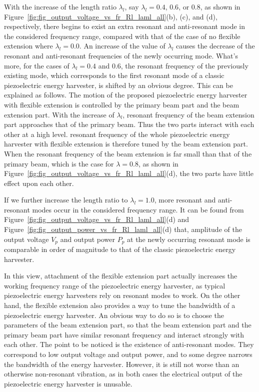 \documentclass{elsarticle}
\begin{document}
With the increase of the length ratio $\lambda_l$, say $\lambda_l = 0.4$, $0.6$, or $0.8$, as shown in Figure~\ref{fig:fig_output_voltage_vs_fr_Rl_laml_all}(b), (c), and (d), respectively, there begins to exist an extra resonant and anti-resonant mode in the considered frequency range, compared with that of the case of no flexible extension where $\lambda_l = 0.0$. An increase of the value of $\lambda_l$ causes the decrease of the resonant and anti-resonant frequencies of the newly occurring mode. What's more, for the cases of $\lambda_l = 0.4$ and $0.6$, the resonant frequency of the previously existing mode, which corresponds to the first resonant mode of a classic piezoelectric energy harvester, is shifted by an obvious degree. This can be explained as follows. The motion of the proposed piezoelectric energy harvester with flexible extension is controlled by the primary beam part and the beam extension part. With the increase of $\lambda_l$, resonant frequency of the beam extension part approaches that of the primary beam. Thus the two parts interact with each other at a high level. resonant frequency of the whole piezoelectric energy harvester with flexible extension is therefore tuned by the beam extension part. When the resonant frequency of the beam extension is far small than that of the primary beam, which is the case for $\lambda = 0.8$, as shown in Figure~\ref{fig:fig_output_voltage_vs_fr_Rl_laml_all}(d), the two parts have little effect upon each other. 


If we further increase the length ratio to $\lambda_l = 1.0$, more resonant and anti-resonant modes occur in the considered frequency range. It can be found from Figure~\ref{fig:fig_output_voltage_vs_fr_Rl_laml_all}(d) and Figure~\ref{fig:fig_output_power_vs_fr_Rl_laml_all}(d) that, amplitude of the output voltage $V_p$ and output power $P_p$ at the newly occurring resonant mode is comparable in order of magnitude to that of the classic piezoelectric energy harvester. 


In this view, attachment of the flexible extension part actually increases the working frequency range of the piezoelectric energy harvester, as typical piezoelectric energy harvesters rely on resonant modes to work. On the other hand, the flexible extension also provides a way to tune the bandwidth of a piezoelectric energy harvester. An obvious way to do so is to choose the parameters of the beam extension part, so that the beam extension part and the primary beam part have similar resonant frequency and interact strongly with each other. The point to be noticed is the existence of anti-resonant modes. They correspond to low output voltage and output power, and to some degree narrows the bandwidth of the energy harvester. However, it is still not worse than an otherwise non-resonant vibration, as in both cases the electrical output of the piezoelectric energy harvester is unusable.
\end{document}
